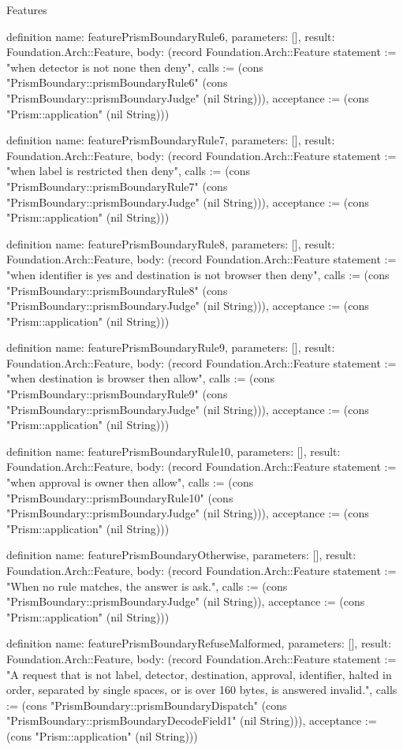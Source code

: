 \begin{lexlean}{Features}
\begin{semanticmodule}
definition{
  name: featurePrismBoundaryRule6,
  parameters: [],
  result: Foundation.Arch::Feature,
  body: (record Foundation.Arch::Feature {statement := "when detector is not none then deny", calls := (cons "PrismBoundary::prismBoundaryRule6" (cons "PrismBoundary::prismBoundaryJudge" (nil String))), acceptance := (cons "Prism::application" (nil String))})
}

definition{
  name: featurePrismBoundaryRule7,
  parameters: [],
  result: Foundation.Arch::Feature,
  body: (record Foundation.Arch::Feature {statement := "when label is restricted then deny", calls := (cons "PrismBoundary::prismBoundaryRule7" (cons "PrismBoundary::prismBoundaryJudge" (nil String))), acceptance := (cons "Prism::application" (nil String))})
}

definition{
  name: featurePrismBoundaryRule8,
  parameters: [],
  result: Foundation.Arch::Feature,
  body: (record Foundation.Arch::Feature {statement := "when identifier is yes and destination is not browser then deny", calls := (cons "PrismBoundary::prismBoundaryRule8" (cons "PrismBoundary::prismBoundaryJudge" (nil String))), acceptance := (cons "Prism::application" (nil String))})
}

definition{
  name: featurePrismBoundaryRule9,
  parameters: [],
  result: Foundation.Arch::Feature,
  body: (record Foundation.Arch::Feature {statement := "when destination is browser then allow", calls := (cons "PrismBoundary::prismBoundaryRule9" (cons "PrismBoundary::prismBoundaryJudge" (nil String))), acceptance := (cons "Prism::application" (nil String))})
}

definition{
  name: featurePrismBoundaryRule10,
  parameters: [],
  result: Foundation.Arch::Feature,
  body: (record Foundation.Arch::Feature {statement := "when approval is owner then allow", calls := (cons "PrismBoundary::prismBoundaryRule10" (cons "PrismBoundary::prismBoundaryJudge" (nil String))), acceptance := (cons "Prism::application" (nil String))})
}

definition{
  name: featurePrismBoundaryOtherwise,
  parameters: [],
  result: Foundation.Arch::Feature,
  body: (record Foundation.Arch::Feature {statement := "When no rule matches, the answer is ask.", calls := (cons "PrismBoundary::prismBoundaryJudge" (nil String)), acceptance := (cons "Prism::application" (nil String))})
}

definition{
  name: featurePrismBoundaryRefuseMalformed,
  parameters: [],
  result: Foundation.Arch::Feature,
  body: (record Foundation.Arch::Feature {statement := "A request that is not label, detector, destination, approval, identifier, halted in order, separated by single spaces, or is over 160 bytes, is answered invalid.", calls := (cons "PrismBoundary::prismBoundaryDispatch" (cons "PrismBoundary::prismBoundaryDecodeField1" (nil String))), acceptance := (cons "Prism::application" (nil String))})
}


\end{semanticmodule}
\end{lexlean}
